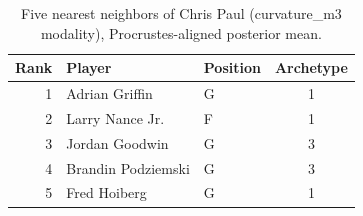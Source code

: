 \begin{table}[htbp]
  \centering\small
  \begin{tabular}{rllc}
    \toprule
    Rank & Player & Position & Archetype \\
    \midrule
    1 & Adrian Griffin & G & 1 \\
    2 & Larry Nance Jr. & F & 1 \\
    3 & Jordan Goodwin & G & 3 \\
    4 & Brandin Podziemski & G & 3 \\
    5 & Fred Hoiberg & G & 1 \\
    \bottomrule
  \end{tabular}
  \caption{Five nearest neighbors of Chris Paul (curvature_m3 modality), Procrustes-aligned posterior mean.}
  \label{tab:Chris_Paul_neighbors_curvature_m3}
\end{table}

